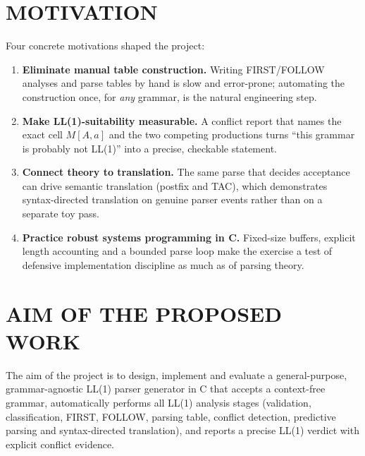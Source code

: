 \documentclass[12pt,a4paper,oneside,openany]{report}
\begin{document}
\section{MOTIVATION}
Four concrete motivations shaped the project:
\begin{enumerate}
  \item \textbf{Eliminate manual table construction.} Writing FIRST/FOLLOW
        analyses and parse tables by hand is slow and error-prone; automating
        the construction once, for \emph{any} grammar, is the natural
        engineering step.
  \item \textbf{Make LL(1)-suitability measurable.} A conflict report that
        names the exact cell $M[A,a]$ and the two competing productions
        turns ``this grammar is probably not LL(1)'' into a precise,
        checkable statement.
  \item \textbf{Connect theory to translation.} The same parse that decides
        acceptance can drive semantic translation (postfix and TAC), which
        demonstrates syntax-directed translation on genuine parser events
        rather than on a separate toy pass.
  \item \textbf{Practice robust systems programming in C.} Fixed-size
        buffers, explicit length accounting and a bounded parse loop make
        the exercise a test of defensive implementation discipline as much
        as of parsing theory.
\end{enumerate}

\section{AIM OF THE PROPOSED WORK}
\label{sec:aim}
The aim of the project is to design, implement and evaluate a
general-purpose, grammar-agnostic LL(1) parser generator in C that accepts a
context-free grammar, automatically performs all LL(1) analysis stages
(validation, classification, FIRST, FOLLOW, parsing table, conflict
detection, predictive parsing and syntax-directed translation), and reports
a precise LL(1) verdict with explicit conflict evidence.
\end{document}
